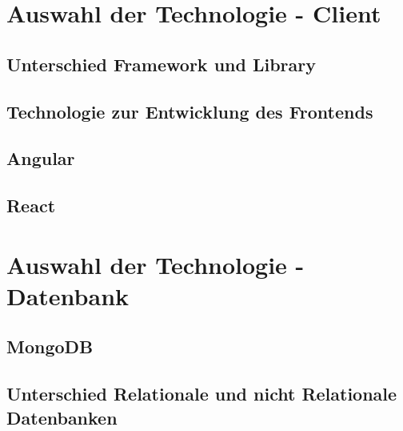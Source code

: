 \section{Auswahl der Technologie - Client}
\lipsum[5-12]

\subsection{Unterschied Framework und Library}
\subsection{Technologie zur Entwicklung des Frontends}
\subsection{Angular}
\subsection{React}

\section{Auswahl der Technologie - Datenbank}
\lipsum[12-18]

\subsection{MongoDB}
\subsection{Unterschied Relationale und nicht Relationale Datenbanken}
